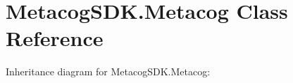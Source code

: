 \hypertarget{classMetacogSDK_1_1Metacog}{}\section{Metacog\+S\+D\+K.\+Metacog Class Reference}
\label{classMetacogSDK_1_1Metacog}


Inheritance diagram for Metacog\+S\+D\+K.\+Metacog\+:

